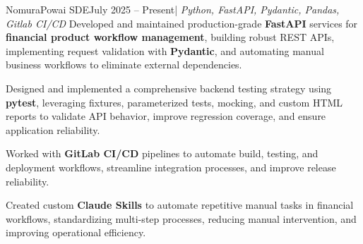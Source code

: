 \resumeSubheading
{Nomura}{Powai}
{SDE}{July 2025 -- Present}{| \textit{Python, FastAPI, Pydantic, Pandas, Gitlab CI/CD}}
\resumeItemListStart    
{}
{Developed and maintained production-grade \textbf{FastAPI} services for \textbf{financial product workflow management}, building robust REST APIs, implementing request validation with \textbf{Pydantic}, and automating manual business workflows to eliminate external dependencies.}

{Designed and implemented a comprehensive backend testing strategy using \textbf{pytest}, leveraging fixtures, parameterized tests, mocking, and custom HTML reports to validate API behavior, improve regression coverage, and ensure application reliability.}


{Worked with \textbf{GitLab CI/CD} pipelines to automate build, testing, and deployment workflows, streamline integration processes, and improve release reliability.}

{Created custom \textbf{Claude Skills} to automate repetitive manual tasks in financial workflows, standardizing multi-step processes, reducing manual intervention, and improving operational efficiency.}